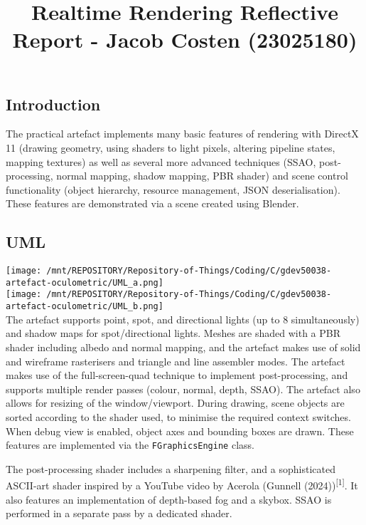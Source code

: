 \documentclass[
]{article}
\title{Realtime Rendering Reflective Report - Jacob Costen (23025180)}
\author{}
\date{}
\begin{document}
\maketitle

\hypertarget{realtime-rendering-reflective-report---jacob-costen-23025180}{%

\hypertarget{introduction}{%
\subsection{Introduction}\label{introduction}}

The practical artefact implements many basic features of rendering with
DirectX 11 (drawing geometry, using shaders to light pixels, altering
pipeline states, mapping textures) as well as several more advanced
techniques (SSAO, post-processing, normal mapping, shadow mapping, PBR
shader) and scene control functionality (object hierarchy, resource
management, JSON deserialisation). These features are demonstrated via a
scene created using Blender.

\hypertarget{uml}{%
\subsection{UML}\label{uml}}

\texttt{[image: /mnt/REPOSITORY/Repository-of-Things/Coding/C/gdev50038-artefact-oculometric/UML\_a.png]}\\
\newline
\texttt{[image: /mnt/REPOSITORY/Repository-of-Things/Coding/C/gdev50038-artefact-oculometric/UML\_b.png]}\\
The artefact supports point, spot, and directional lights (up to 8
simultaneously) and shadow maps for spot/directional lights. Meshes are
shaded with a PBR shader including albedo and normal mapping, and the
artefact makes use of solid and wireframe rasterisers and triangle and
line assembler modes. The artefact makes use of the full-screen-quad
technique to implement post-processing, and supports multiple render
passes (colour, normal, depth, SSAO). The artefact also allows for
resizing of the window/viewport. During drawing, scene objects are
sorted according to the shader used, to minimise the required context
switches. When debug view is enabled, object axes and bounding boxes are
drawn. These features are implemented via the \texttt{FGraphicsEngine}
class.

The post-processing shader includes a sharpening filter, and a
sophisticated ASCII-art shader inspired by a YouTube video by Acerola
(Gunnell (2024))\textsuperscript{{[}1{]}}. It also features an
implementation of depth-based fog and a skybox. SSAO is performed in a
separate pass by a dedicated shader.

}
\end{document}
